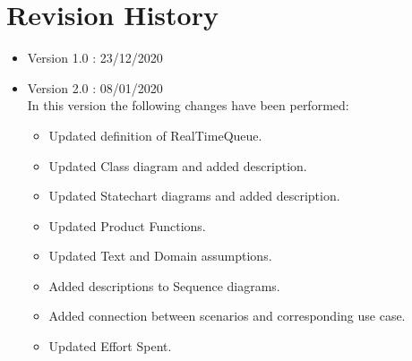 \section{Revision History}

\begin{itemize}
	\item Version 1.0 : 23/12/2020
	\item Version 2.0 : 08/01/2020 \\ In this version the following changes have been performed:
\begin{itemize}
	\item Updated definition of RealTimeQueue.
	\item Updated Class diagram and added description.
	\item Updated Statechart diagrams and added description.
	\item Updated Product Functions.
	\item Updated Text and Domain assumptions.
	\item Added descriptions to Sequence diagrams.
	\item Added connection between scenarios and corresponding use case.
	\item Updated Effort Spent.
\end{itemize}
\end{itemize}